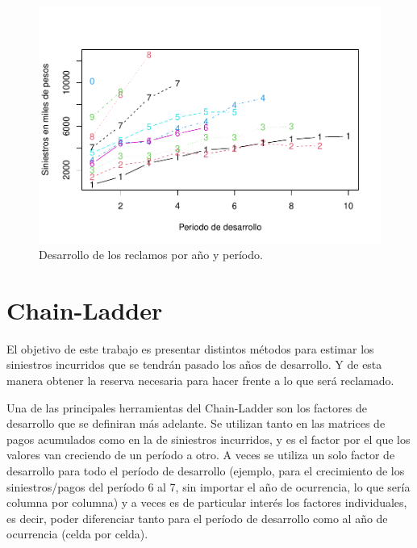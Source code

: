 \documentclass[
  12pt,
]{article}
\begin{document}
\begin{figure}
\centering
\includegraphics{informe_files/figure-latex/unnamed-chunk-4-1.pdf}
\caption{\label{triangle} Desarrollo de los reclamos por año y período.}
\end{figure}

\section{Chain-Ladder}\label{chain-ladder}

El objetivo de este trabajo es presentar distintos métodos para estimar
los siniestros incurridos que se tendrán pasado los años de desarrollo.
Y de esta manera obtener la reserva necesaria para hacer frente a lo que
será reclamado.

Una de las principales herramientas del Chain-Ladder son los factores de
desarrollo que se definiran más adelante. Se utilizan tanto en las
matrices de pagos acumulados como en la de siniestros incurridos, y es
el factor por el que los valores van creciendo de un período a otro. A
veces se utiliza un solo factor de desarrollo para todo el período de
desarrollo (ejemplo, para el crecimiento de los siniestros/pagos del
período 6 al 7, sin importar el año de ocurrencia, lo que sería columna
por columna) y a veces es de particular interés los factores
individuales, es decir, poder diferenciar tanto para el período de
desarrollo como al año de ocurrencia (celda por celda).
\end{document}
